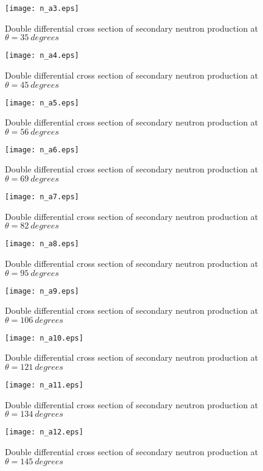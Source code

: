 \documentclass[12pt]{article}
\begin{document}
\begin{figure}[htbp]
\caption{Double differential cross section of secondary neutron production at $\theta = 35~degrees$}
\label{figa3} 
\centerline{\texttt{[image: n\_a3.eps]}}
\end{figure}

\begin{figure}[htbp]
\caption{Double differential cross section of secondary neutron production at $\theta = 45~degrees$}
\label{figa4} 
\centerline{\texttt{[image: n\_a4.eps]}}
\end{figure}

\begin{figure}[htbp]
\caption{Double differential cross section of secondary neutron production at $\theta = 56~degrees$}
\label{figa5} 
\centerline{\texttt{[image: n\_a5.eps]}}
\end{figure}

\begin{figure}[htbp]
\caption{Double differential cross section of secondary neutron production at $\theta = 69~degrees$}
\label{figa6} 
\centerline{\texttt{[image: n\_a6.eps]}}
\end{figure}

\begin{figure}[htbp]
\caption{Double differential cross section of secondary neutron production at $\theta = 82~degrees$}
\label{figa7} 
\centerline{\texttt{[image: n\_a7.eps]}}
\end{figure}

\begin{figure}[htbp]
\caption{Double differential cross section of secondary neutron production at $\theta = 95~degrees$}
\label{figa8} 
\centerline{\texttt{[image: n\_a8.eps]}}
\end{figure}

\begin{figure}[htbp]
\caption{Double differential cross section of secondary neutron production at $\theta = 106~degrees$}
\label{figa9} 
\centerline{\texttt{[image: n\_a9.eps]}}
\end{figure}

\begin{figure}[htbp]
\caption{Double differential cross section of secondary neutron production at $\theta = 121~degrees$}
\label{figa10} 
\centerline{\texttt{[image: n\_a10.eps]}}
\end{figure}

\begin{figure}[htbp]
\caption{Double differential cross section of secondary neutron production at $\theta = 134~degrees$}
\label{figa11} 
\centerline{\texttt{[image: n\_a11.eps]}}
\end{figure}

\begin{figure}[htbp]
\caption{Double differential cross section of secondary neutron production at $\theta = 145~degrees$}
\label{figa12} 
\centerline{\texttt{[image: n\_a12.eps]}}
\end{figure}
\end{document}
